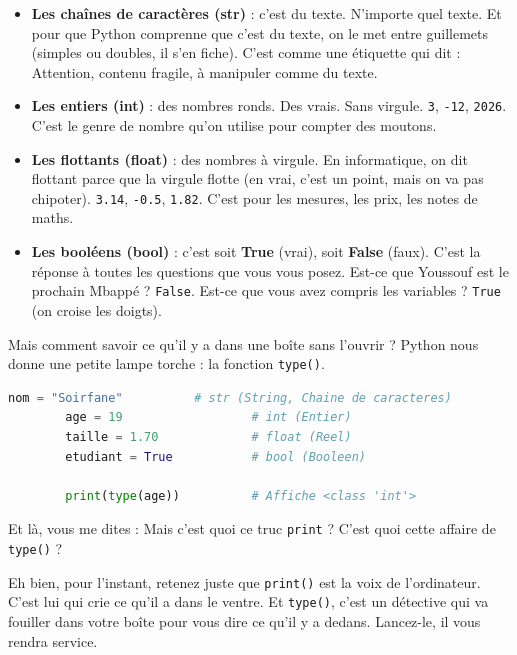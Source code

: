 \documentclass[12pt,a4paper]{article}
\begin{document}
	   \begin{itemize}
	   	\item [\ding{182}] \textbf{Les chaînes de caractères (str)} : c'est du texte. N'importe quel texte. Et pour que Python comprenne que c'est du texte, on le met entre guillemets (simples ou doubles, il s'en fiche). C'est comme une étiquette qui dit : \og Attention, contenu fragile, à manipuler comme du texte. \fg
	   	\item [\ding{183}] \textbf{Les entiers (int)} : des nombres ronds. Des vrais. Sans virgule. \texttt{3}, \texttt{-12}, \texttt{2026}. C'est le genre de nombre qu'on utilise pour compter des moutons.
	   	\item [\ding{184}] \textbf{Les flottants (float)} : des nombres à virgule. En informatique, on dit \og flottant \fg parce que la virgule \og flotte \fg (en vrai, c'est un point, mais on va pas chipoter). \texttt{3.14}, \texttt{-0.5}, \texttt{1.82}. C'est pour les mesures, les prix, les notes de maths.
	   	\item [\ding{185}] \textbf{Les booléens (bool)} : c'est soit \textbf{True} (vrai), soit \textbf{False} (faux). C'est la réponse à toutes les questions que vous vous posez. Est-ce que Youssouf est le prochain Mbappé ? \texttt{False}. Est-ce que vous avez compris les variables ? \texttt{True} (on croise les doigts).
	   \end{itemize}
	   
	   Mais comment savoir ce qu'il y a dans une boîte sans l'ouvrir ? Python nous donne une petite lampe torche : la fonction \texttt{type()}.
	   
	   \begin{lstlisting}[language=Python]
	   	nom = "Soirfane"          # str (String, Chaine de caracteres)
	   	age = 19                  # int (Entier)
	   	taille = 1.70             # float (Reel)
	   	etudiant = True           # bool (Booleen)
	   	
	   	print(type(age))          # Affiche <class 'int'>
	   \end{lstlisting}
	   
	   Et là, vous me dites : \og Mais c'est quoi ce truc \texttt{print} ? C'est quoi cette affaire de \texttt{type()} ? \fg
	   
	   Eh bien, pour l'instant, retenez juste que \texttt{print()} est la voix de l'ordinateur. C'est lui qui crie ce qu'il a dans le ventre. Et \texttt{type()}, c'est un détective qui va fouiller dans votre boîte pour vous dire ce qu'il y a dedans. Lancez-le, il vous rendra service.
	   
\end{document}
